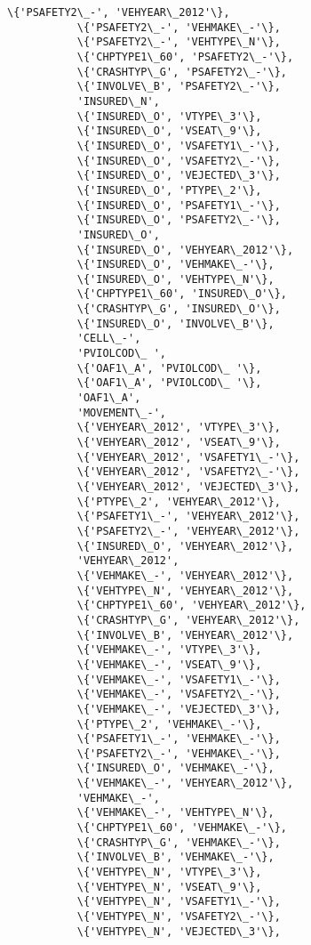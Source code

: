 \documentclass[11pt]{article}
\begin{document}
\begin{Verbatim}[commandchars=\\\{\}]
           \{'PSAFETY2\_-', 'VEHYEAR\_2012'\},
           \{'PSAFETY2\_-', 'VEHMAKE\_-'\},
           \{'PSAFETY2\_-', 'VEHTYPE\_N'\},
           \{'CHPTYPE1\_60', 'PSAFETY2\_-'\},
           \{'CRASHTYP\_G', 'PSAFETY2\_-'\},
           \{'INVOLVE\_B', 'PSAFETY2\_-'\},
           'INSURED\_N',
           \{'INSURED\_O', 'VTYPE\_3'\},
           \{'INSURED\_O', 'VSEAT\_9'\},
           \{'INSURED\_O', 'VSAFETY1\_-'\},
           \{'INSURED\_O', 'VSAFETY2\_-'\},
           \{'INSURED\_O', 'VEJECTED\_3'\},
           \{'INSURED\_O', 'PTYPE\_2'\},
           \{'INSURED\_O', 'PSAFETY1\_-'\},
           \{'INSURED\_O', 'PSAFETY2\_-'\},
           'INSURED\_O',
           \{'INSURED\_O', 'VEHYEAR\_2012'\},
           \{'INSURED\_O', 'VEHMAKE\_-'\},
           \{'INSURED\_O', 'VEHTYPE\_N'\},
           \{'CHPTYPE1\_60', 'INSURED\_O'\},
           \{'CRASHTYP\_G', 'INSURED\_O'\},
           \{'INSURED\_O', 'INVOLVE\_B'\},
           'CELL\_-',
           'PVIOLCOD\_ ',
           \{'OAF1\_A', 'PVIOLCOD\_ '\},
           \{'OAF1\_A', 'PVIOLCOD\_ '\},
           'OAF1\_A',
           'MOVEMENT\_-',
           \{'VEHYEAR\_2012', 'VTYPE\_3'\},
           \{'VEHYEAR\_2012', 'VSEAT\_9'\},
           \{'VEHYEAR\_2012', 'VSAFETY1\_-'\},
           \{'VEHYEAR\_2012', 'VSAFETY2\_-'\},
           \{'VEHYEAR\_2012', 'VEJECTED\_3'\},
           \{'PTYPE\_2', 'VEHYEAR\_2012'\},
           \{'PSAFETY1\_-', 'VEHYEAR\_2012'\},
           \{'PSAFETY2\_-', 'VEHYEAR\_2012'\},
           \{'INSURED\_O', 'VEHYEAR\_2012'\},
           'VEHYEAR\_2012',
           \{'VEHMAKE\_-', 'VEHYEAR\_2012'\},
           \{'VEHTYPE\_N', 'VEHYEAR\_2012'\},
           \{'CHPTYPE1\_60', 'VEHYEAR\_2012'\},
           \{'CRASHTYP\_G', 'VEHYEAR\_2012'\},
           \{'INVOLVE\_B', 'VEHYEAR\_2012'\},
           \{'VEHMAKE\_-', 'VTYPE\_3'\},
           \{'VEHMAKE\_-', 'VSEAT\_9'\},
           \{'VEHMAKE\_-', 'VSAFETY1\_-'\},
           \{'VEHMAKE\_-', 'VSAFETY2\_-'\},
           \{'VEHMAKE\_-', 'VEJECTED\_3'\},
           \{'PTYPE\_2', 'VEHMAKE\_-'\},
           \{'PSAFETY1\_-', 'VEHMAKE\_-'\},
           \{'PSAFETY2\_-', 'VEHMAKE\_-'\},
           \{'INSURED\_O', 'VEHMAKE\_-'\},
           \{'VEHMAKE\_-', 'VEHYEAR\_2012'\},
           'VEHMAKE\_-',
           \{'VEHMAKE\_-', 'VEHTYPE\_N'\},
           \{'CHPTYPE1\_60', 'VEHMAKE\_-'\},
           \{'CRASHTYP\_G', 'VEHMAKE\_-'\},
           \{'INVOLVE\_B', 'VEHMAKE\_-'\},
           \{'VEHTYPE\_N', 'VTYPE\_3'\},
           \{'VEHTYPE\_N', 'VSEAT\_9'\},
           \{'VEHTYPE\_N', 'VSAFETY1\_-'\},
           \{'VEHTYPE\_N', 'VSAFETY2\_-'\},
           \{'VEHTYPE\_N', 'VEJECTED\_3'\},

\end{Verbatim}
\end{document}
